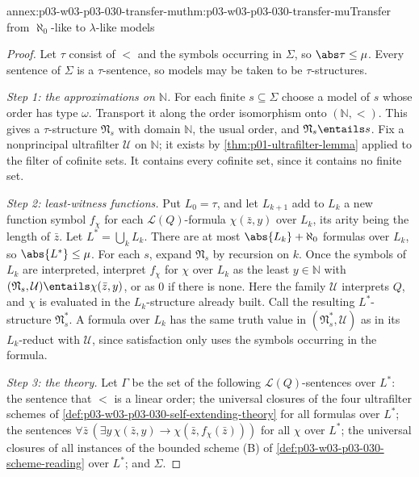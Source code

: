 \begin{annexitem}{annex:p03-w03-p03-030-transfer-mu}{thm:p03-w03-p03-030-transfer-mu}{Transfer from \(\aleph_0\)-like to \(\lambda\)-like models}
\begin{proof}
Let \(\tau\) consist of \(<\) and the symbols occurring in \(\Sigma\), so
\(\abs\tau\le\mu\).  Every sentence of \(\Sigma\) is a \(\tau\)-sentence, so
models may be taken to be \(\tau\)-structures.

\emph{Step 1: the approximations on \(\mathbb N\).}  For each finite
\(s\subseteq\Sigma\) choose a model of \(s\) whose order has type
\(\omega\).  Transport it along the order isomorphism onto
\((\mathbb N,<)\).  This gives a \(\tau\)-structure \(\mathfrak N_s\) with
domain \(\mathbb N\), the usual order, and \(\mathfrak N_s\entails s\).  Fix
a nonprincipal ultrafilter \(\mathcal U\) on \(\mathbb N\); it exists by
\cref{thm:p01-ultrafilter-lemma} applied to the filter of cofinite sets.  It
contains every cofinite set, since it contains no finite set.

\emph{Step 2: least-witness functions.}  Put \(L_0=\tau\), and let
\(L_{k+1}\) add to \(L_k\) a new function symbol \(f_\chi\) for each
\(\mathscr L(Q)\)-formula \(\chi(\bar z,y)\) over \(L_k\), its arity being
the length of \(\bar z\).  Let \(L^*=\bigcup_kL_k\).  There are at most
\(\abs{L_k}+\aleph_0\) formulas over \(L_k\), so \(\abs{L^*}\le\mu\).  For
each \(s\), expand \(\mathfrak N_s\) by recursion on \(k\).  Once the
symbols of \(L_k\) are interpreted, interpret \(f_\chi\) for \(\chi\) over
\(L_k\) as the least \(y\in\mathbb N\) with
\((\mathfrak N_s,\mathcal U)\entails\chi(\bar z,y)\), or as \(0\) if there is
none.  Here the family \(\mathcal U\) interprets \(Q\), and \(\chi\) is
evaluated in the \(L_k\)-structure already built.  Call the resulting
\(L^*\)-structure \(\mathfrak N^*_s\).  A formula over \(L_k\) has the same
truth value in \((\mathfrak N^*_s,\mathcal U)\) as in its \(L_k\)-reduct
with \(\mathcal U\), since satisfaction only uses the symbols occurring in
the formula.

\emph{Step 3: the theory.}  Let \(\Gamma\) be the set of the following
\(\mathscr L(Q)\)-sentences over \(L^*\): the sentence that \(<\) is a linear
order; the universal closures of the four ultrafilter schemes of
\cref{def:p03-w03-p03-030-self-extending-theory} for all formulas over
\(L^*\); the sentences \(\forall\bar z\,(\exists y\,\chi(\bar z,y)\rightarrow
\chi(\bar z,f_\chi(\bar z)))\) for all \(\chi\) over \(L^*\); the universal
closures of all instances of the bounded scheme (B) of
\cref{def:p03-w03-p03-030-scheme-reading} over \(L^*\); and \(\Sigma\).


\end{proof}
\end{annexitem}
